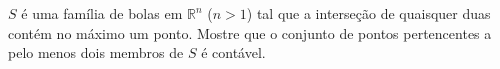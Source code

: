\(S\) é uma família de bolas em \(\mathbb{R}^{n}\) (\(n > 1\)) tal que a interseção de quaisquer duas contém no máximo um ponto. Mostre que o conjunto de pontos pertencentes a pelo menos dois membros de \(S\) é contável.
